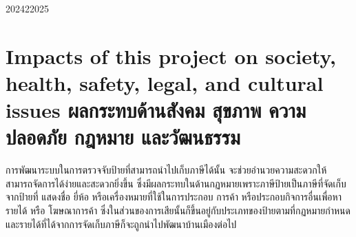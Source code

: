 \begin{plan}{7}{2024}{2}{2025}
\end{plan}


\section{\ifenglish%
Impacts of this project on society, health, safety, legal, and cultural issues
\else%
ผลกระทบด้านสังคม สุขภาพ ความปลอดภัย กฎหมาย และวัฒนธรรม
\fi}

การพัฒนาระบบในการตรวจจับป้ายที่สามารถนำไปเก็บภาษีได้นั้น จะช่วยอำนวยความสะดวกให้สามารถจัดการได้ง่ายและสะดวกยิ่งขึ้น 
ซึ่งมีผลกระทบในด้านกฏหมายเพราะภาษีป้ายเป็นภาษีที่จัดเก็บจากป้ายที่ แสดงชื่อ ยี่ห้อ หรือเครื่องหมายที่ใช้ในการประกอบ การค้า หรือประกอบกิจการอื่นเพื่อหารายได้ หรือ 
โฆษณาการค้า ซึ่งในส่วนของการเสียนั้นก็ขึ้นอยู่กับประเภทของป้ายตามที่กฏหมายกำหนด และรายได้ที่ได้จากการจัดเก็บภาษีก็จะถูกนำไปพัฒนาบ้านเมืองต่อไป
